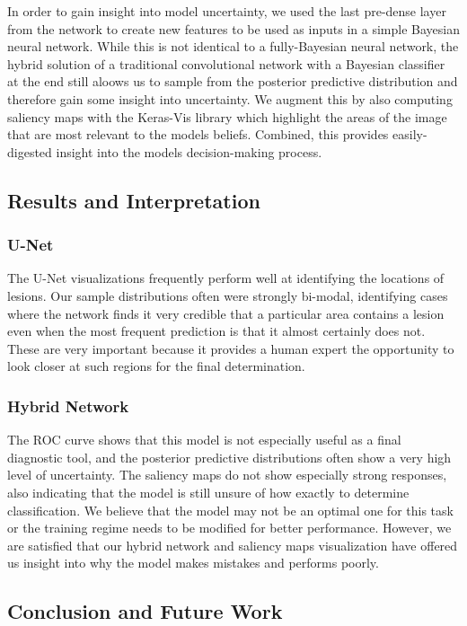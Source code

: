 \documentclass[12pt]{article}
\begin{document}
{In order to gain insight into model uncertainty, we used the last pre-dense layer from the network to create new features to be used as inputs in a simple Bayesian neural network. While this is not identical to a fully-Bayesian neural network, the hybrid solution of a traditional convolutional network with a Bayesian classifier at the end still aloows us to sample from the posterior predictive distribution and therefore gain some insight into uncertainty. We augment this by also computing saliency maps with the Keras-Vis library which highlight the areas of the image that are most relevant to the models beliefs. Combined, this provides easily-digested insight into the models decision-making process.

\subsection*{Results and Interpretation}

\subsubsection*{U-Net}
The U-Net visualizations frequently perform well at identifying the locations of lesions. Our sample distributions often were strongly bi-modal, identifying cases where the network finds it very credible that a particular area contains a lesion even when the most frequent prediction is that it almost certainly does not. These are very important because it provides a human expert the opportunity to look closer at such regions for the final determination.

\subsubsection*{Hybrid Network}
The ROC curve shows that this model is not especially useful as a final diagnostic tool, and the posterior predictive distributions often show a very high level of uncertainty. The saliency maps do not show especially strong responses,  also indicating that the model is still unsure of how exactly to determine classification. We believe that the model may not be an optimal one for this task or the training regime needs to be modified for better performance. However, we are satisfied that our hybrid network and saliency maps visualization have offered us insight into why the model makes mistakes and performs poorly.

\subsection*{Conclusion and Future Work}


}
\end{document}

